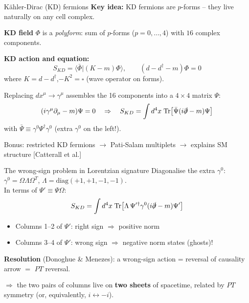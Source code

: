 \documentclass[aspectratio=169]{beamer}
\newcommand{\Red}[1]{{\color{cptred}#1}}
\newcommand{\Blue}[1]{{\color{cptblue}#1}}
\newcommand{\Green}[1]{{\color{cptgreen}#1}}
\begin{document}
\begin{frame}{K\"{a}hler-Dirac (KD) fermions}
  \textbf{Key idea:} KD fermions are $p$-forms -- they live naturally on any cell complex.

  \vspace{0.5em}
  \textbf{KD field} $\Phi$ is a \emph{polyform}: sum of $p$-forms ($p=0,\ldots,4$) with $16$ complex components.

  \vspace{0.4em}
  \textbf{KD action and equation:}
  \[
    S_{KD} = \langle\bar\Phi|(K-m)\Phi\rangle, \qquad
    (d - d^\dagger - m)\Phi = 0
  \]
  where $K = d - d^\dagger$,\quad $-K^2 = \square$ (wave operator on forms).

  \vspace{0.4em}
  Replacing $dx^\mu \to \gamma^\mu$ assembles the 16 components into a $4\times4$ matrix $\Psi$:
  \[
    (i\gamma^\mu\partial_\mu - m)\Psi = 0
    \quad\Rightarrow\quad
    S_{KD} = \int d^4x\;\mathrm{Tr}\!\left[\bar\Psi(i\slashed\partial - m)\Psi\right]
  \]
  with $\bar\Psi \equiv \gamma^0\Psi^\dagger\gamma^0$ (extra $\gamma^0$ on the left!).

  \vspace{0.3em}
  \Blue{Bonus:} restricted KD fermions $\to$ Pati-Salam multiplets $\to$ explains SM structure \hfill{\small [Catterall et al.]}
\end{frame}

\begin{frame}{The wrong-sign problem in Lorentzian signature}
  Diagonalise the extra $\gamma^0$: $\gamma^0 = \Omega\Lambda\Omega^T$,
  $\Lambda = \mathrm{diag}(+1,+1,-1,-1)$.\\[0.5em]
  In terms of $\Psi' \equiv \Psi\Omega$:
  \[
    S_{KD} = \int d^4x\;\mathrm{Tr}\!\left[\Lambda\,\Psi'{}^\dagger\gamma^0
             (i\slashed\partial - m)\Psi'\right]
  \]
  \begin{itemize}
    \item Columns 1--2 of $\Psi'$: \Green{right sign} $\Rightarrow$ positive norm
    \item Columns 3--4 of $\Psi'$: \Red{wrong sign} $\Rightarrow$ \Red{negative norm states (ghosts)!}
  \end{itemize}

  \vspace{0.5em}
  \textbf{Resolution} (Donoghue \& Menezes): a wrong-sign action = reversal of causality arrow
  $=$ \Blue{$PT$ reversal}.

  \vspace{0.4em}
  $\Rightarrow$ the two pairs of columns live on \textbf{two sheets} of spacetime, related by $PT$ symmetry
  (or, equivalently, $i \leftrightarrow -i$).
\end{frame}
\end{document}

